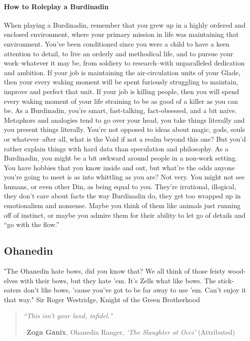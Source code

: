 \documentclass[oneside,11pt,english]{book}
\begin{document}
\paragraph{How to Roleplay a Burdinadin}
When playing a Burdinadin, remember that you grew up in a highly ordered and enclosed environment, where your primary mission in life was maintaining that environment. You’ve been conditioned since you 
were a child to have a keen attention to detail, to live an orderly and methodical life, and to pursue your work--whatever it may be, from soldiery to research--with unparalleled dedication and ambition. If your job is maintaining the air-circulation units of your Glade, then your every waking moment will be spent furiously struggling to maintain, improve and perfect that unit. If your job is killing people, then you will spend every waking moment of your life straining to be as good of a killer as you can be. As a Burdinadin, you’re smart, fast-talking, fact-obsessed, and a bit naive. Metaphors and analogies tend to go over your head, you take things literally and you present things literally. You’re not opposed to ideas about magic, gods, souls or whatever--after all, what is the Void if not a realm beyond this one? But you’d rather explain things with hard data than speculation and philosophy. As a Burdinadin, you might be a bit awkward around people in a non-work setting. You have hobbies that you know inside and out, but what’re the odds anyone you’re going to meet is as into whittling as you are? Not very. You might not see humans, or even other Din, as being equal to you. They’re irrational, illogical, they don’t care about 
facts the way Burdinadin do, they get too wrapped up in emotionalism and nonsense. Maybe you think of them like animals just running off of instinct, or maybe you admire them for their ability to let go of 
details and “go with the flow.” 
\subsection{Ohanedin}
"The Ohanedin hate bows, did you know that? We all think of those feisty wood-elves with their bows, but they hate 'em. It's Zells 
what like bows. The stick-eaters don't like bows, 'cause you've got to be far away to use 'em. Can't enjoy it that way." 
Sir Roger Westridge, Knight of the Green Brotherhood 
 
\begin{quote}
\emph{``This isn't your land, infidel."} 

\hfill--\textbf{Zoga Ganix}, Ohanedin Ranger, \textit{‘The Slaughter at Occi’} (Attributed) 
\end{quote}
\end{document}
